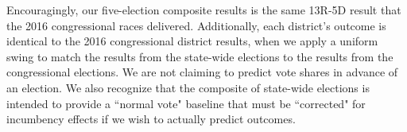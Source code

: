     Encouragingly, our five-election composite results is the same 13R-5D result that the 2016 congressional races delivered.  
    Additionally, each district's outcome is identical to the 2016 congressional district results, when we apply a uniform swing to match the results from the state-wide elections to the results from the congressional elections. We are not claiming to predict vote shares in advance of an election. We also recognize that the composite of state-wide elections is intended to provide a ``normal vote" baseline that must be ``corrected" for incumbency effects if we wish to actually predict outcomes.
\par

